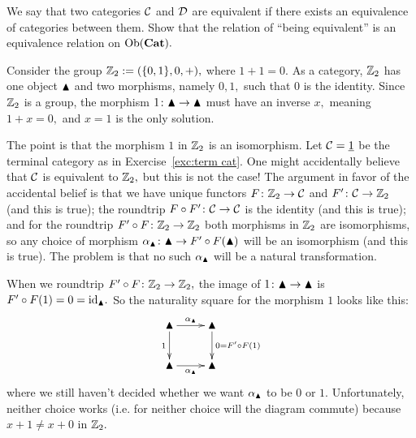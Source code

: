 \documentclass[CT4S-EN-RU]{subfiles}
\begin{document}
\begin{exerciseRUS}
\end{exerciseRUS}

\begin{exerciseENG}
We say that two categories $\mathcal{C}$ and $\mathcal{D}$ are equivalent if there exists an equivalence of categories between them. Show that the relation of “being equivalent” is an equivalence relation on $\textnormal{Ob}({\mathbf{Cat}}).$
\end{exerciseENG}

\begin{exerciseRUS}
\end{exerciseRUS}

\begin{exampleENG}\label{ex:Z1 not equiv Z2}
Consider the group ${\mathbb Z}_2:=(\{0,1\},0,+),$ where $1+1=0.$ As a category, ${\mathbb Z}_2$ has one object $\blacktriangle$ and two morphisms, namely $0,1,$ such that $0$ is the identity. Since ${\mathbb Z}_2$ is a group, the morphism $1\colon\blacktriangle\rightarrow\blacktriangle$ must have an inverse $x,$ meaning $1+x=0,$ and $x=1$ is the only solution.

The point is that the morphism $1$ in ${\mathbb Z}_2$ is an isomorphism. Let $\mathcal{C}=\underline{1}$ be the terminal category as in Exercise~\ref{exc:term cat}. One might accidentally believe that $\mathcal{C}$ is equivalent to ${\mathbb Z}_2,$ but this is not the case! The argument in favor of the accidental belief is that we have unique functors $F\colon{\mathbb Z}_2\rightarrow\mathcal{C}$ and $F'\colon\mathcal{C}\rightarrow{\mathbb Z}_2$ (and this is true); the roundtrip $F\circ F'\colon\mathcal{C}\rightarrow\mathcal{C}$ is the identity (and this is true); and for the roundtrip $F'\circ F\colon{\mathbb Z}_2\rightarrow{\mathbb Z}_2$ both morphisms in ${\mathbb Z}_2$ are isomorphisms, so any choice of morphism $\alpha_\blacktriangle\colon\blacktriangle\rightarrow F'\circ F(\blacktriangle)$ will be an isomorphism (and this is true). The problem is that no such $\alpha_\blacktriangle$ will be a natural transformation.

When we roundtrip $F'\circ F\colon{\mathbb Z}_2\rightarrow{\mathbb Z}_2,$ the image of $1\colon\blacktriangle\rightarrow\blacktriangle$ is $F'\circ F(1)=0=\textnormal{id}_{\blacktriangle}.$ So the naturality square for the morphism $1$ looks like this:
$$
\xymatrix{\monOb\ar[r]^{\alpha_\monOb}\ar[d]_{1}&\monOb\ar[d]^{0=F'\circ F(1)}\\\monOb\ar[r]_{\alpha_\monOb}&\monOb}
$$
where we still haven't decided whether we want $\alpha_\blacktriangle$ to be $0$ or $1.$ Unfortunately, neither choice works (i.e. for neither choice will the diagram commute) because $x+1\neq x+0$ in ${\mathbb Z}_2.$
\end{exampleENG}

\begin{exampleRUS}\label{ex:Z1 not equiv Z2}
\end{exampleRUS}
\end{document}
